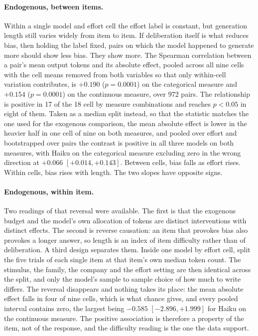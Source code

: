 \paragraph{Endogenous, between items.} Within a single model and effort cell
the effort label is constant, but generation length still varies widely from
item to item. If deliberation itself is what reduces bias, then holding the
label fixed, pairs on which the model happened to generate more should show
less bias. They show more. The Spearman correlation between a pair's mean
output tokens and its absolute effect, pooled across all nine cells with the
cell means removed from both variables so that only within-cell variation
contributes, is $+0.190$ ($p = 0.0001$) on the categorical measure and
$+0.154$ ($p = 0.0001$) on the continuous measure, over 972 pairs. The
relationship is positive in 17 of the 18 cell by measure combinations and
reaches $p < 0.05$ in eight of them. Taken as a median split instead, so that
the statistic matches the one used for the exogenous comparison, the mean
absolute effect is lower in the heavier half in one cell of nine on both
measures, and pooled over effort and bootstrapped over pairs the contrast is
positive in all three models on both measures, with Haiku on the categorical
measure excluding zero in the wrong direction at $+0.066$ $[+0.014, +0.143]$.
Between cells, bias falls as effort rises. Within cells, bias rises with
length. The two slopes have opposite signs.

\paragraph{Endogenous, within item.} Two readings of that reversal were
available. The first is that the exogenous budget and the model's own
allocation of tokens are distinct interventions with distinct effects. The
second is reverse causation: an item that provokes bias also provokes a
longer answer, so length is an index of item difficulty rather than of
deliberation. A third design separates them. Inside one model by effort cell,
split the five trials of each single item at that item's own median token
count. The stimulus, the family, the company and the effort setting are then
identical across the split, and only the model's sample to sample choice of
how much to write differs. The reversal disappears and nothing takes its
place: the mean absolute effect falls in four of nine cells, which is what
chance gives, and every pooled interval contains zero, the largest being
$-0.585$ $[-2.896, +1.999]$ for Haiku on the continuous measure. The positive
association is therefore a property of the item, not of the response, and the
difficulty reading is the one the data support.

